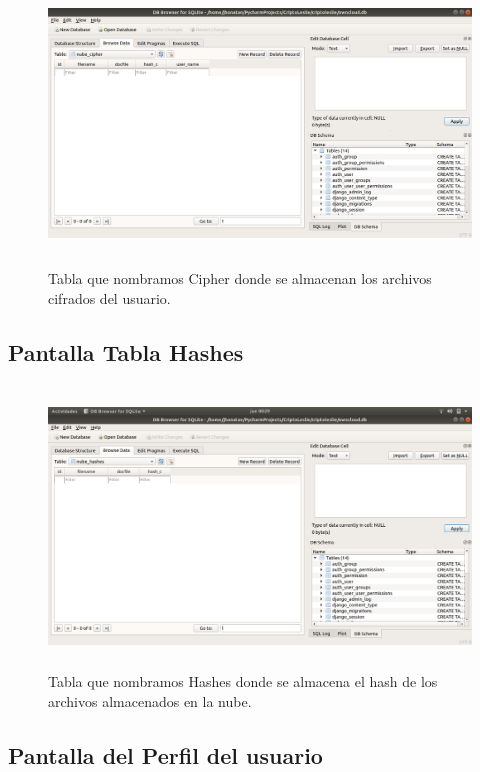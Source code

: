 			\begin{figure}[H]
			\centering
			\includegraphics[width=14cm, height=7.5cm]{./images/Implementacion/BDTablaCipher.png}
			\caption{Tabla que nombramos Cipher donde se almacenan los archivos cifrados del usuario.}
			\label{fig:6-1-7} 
			\end{figure}

\subsection{Pantalla Tabla Hashes}

			\begin{figure}[H]
			\centering
			\includegraphics[width=14cm, height=7.5cm]{./images/Implementacion/BDTablaHashes.png}
			\caption{Tabla que nombramos Hashes donde se almacena el hash de los archivos almacenados en la nube.}
			\label{fig:6-1-8} 
			\end{figure}

\subsection{Pantalla del Perfil del usuario}

